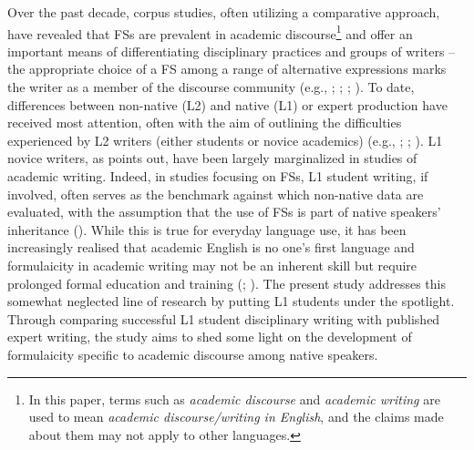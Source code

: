 \documentclass[output=paper]{langscibook}
\begin{document}
Over the past decade, corpus studies, often utilizing a comparative approach, have revealed that FSs are prevalent in academic discourse\footnote{In this paper, terms such as \textit{academic discourse} and \textit{academic writing} are used to mean \textit{academic discourse/writing in English}, and the claims made about them may not apply to other languages.} and offer an important means of differentiating disciplinary practices and groups of writers – the appropriate choice of a FS among a range of alternative expressions marks the writer as a member of the discourse community (e.g., \citealt{BiberEtAl2004}; \citealt{Cortes2004}; \citealt{Hyland2008Lexical,Hyland2012}; \citealt{Durrant2017}). To date, differences between non-native (L2) and native (L1) or expert production have received most attention, often with the aim of outlining the difficulties experienced by L2 writers (either students or novice academics) (e.g., \citealt{Hyland2008Academic}; \citealt{ChenBaker2010}; \citealt{ÄdelErman2012}). L1 novice writers, as \citet{Hyland2016} points out, have been largely marginalized in studies of academic writing. Indeed, in studies focusing on FSs, L1 student writing, if involved, often serves as the benchmark against which non-native data are evaluated, with the assumption that the use of FSs is part of native speakers’ inheritance (\citealt{WrayPerkins2000}). While this is true for everyday language use, it has been increasingly realised that academic English is no one’s first language and formulaicity in academic writing may not be an inherent skill but require prolonged formal education and training (\citealt{FergusonEtAl2011}; \citealt{Pérez-Llantada2014}). The present study addresses this somewhat neglected line of research by putting L1 students under the spotlight. Through comparing successful L1 student disciplinary writing with published expert writing, the study aims to shed some light on the development of formulaicity specific to academic discourse among native speakers.
\end{document}

